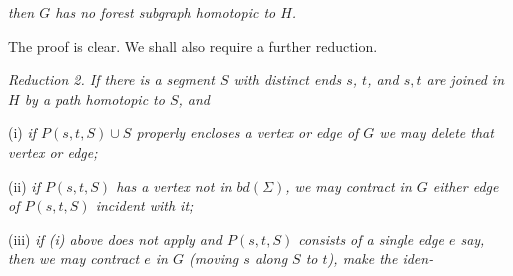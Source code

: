 \textit{then $G$ has no forest subgraph homotopic to $H$.}

The proof is clear. We shall also require a further reduction.

\textit{Reduction 2. If there is a segment $S$ with distinct ends $s$, $t$, and $s, t$ are joined in $H$ by a path homotopic to $S$, and}

\hspace*{12pt}(i) \textit{if $P(s, t, S) \cup S$ properly encloses a vertex or edge of $G$ we may delete that vertex or edge;}

\hspace*{12pt}(ii) \textit{if $P(s, t, S)$ has a vertex not in $bd(\Sigma)$, we may contract in $G$ either edge of $P(s, t, S)$ incident with it;}

\hspace*{12pt}(iii) \textit{if (i) above does not apply and $P(s, t, S)$ consists of a single edge $e$ say, then we may contract $e$ in $G$ (moving $s$ along $S$ to $t$), make the iden-}
